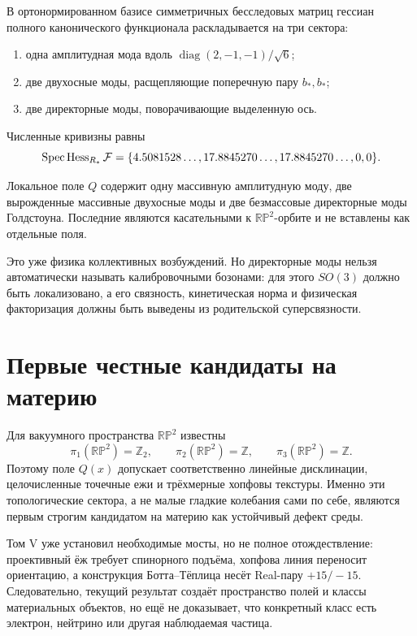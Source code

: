 В ортонормированном базисе симметричных бесследовых матриц гессиан полного
канонического функционала раскладывается на три сектора:
\begin{enumerate}
 \item одна амплитудная мода вдоль
 $\operatorname{diag}(2,-1,-1)/\sqrt6$;
 \item две двухосные моды, расщепляющие поперечную пару $b_*,b_*$;
 \item две директорные моды, поворачивающие выделенную ось.
\end{enumerate}
Численные кривизны равны
\begin{equation}
 \operatorname{Spec}\operatorname{Hess}_{R_*}\mathcal F
 =\{4.5081528\ldots,
 17.8845270\ldots,17.8845270\ldots,0,0\}.
 \label{eq:v6-projective-field-hessian}
\end{equation}

\begin{theorem}
Локальное поле $Q$ содержит одну массивную амплитудную моду, две
вырожденные массивные двухосные моды и две безмассовые директорные моды
Голдстоуна. Последние являются касательными к $\mathbb{RP}^2$-орбите и не
вставлены как отдельные поля.
\end{theorem}

Это уже физика коллективных возбуждений. Но директорные моды нельзя
автоматически называть калибровочными бозонами: для этого $SO(3)$ должно
быть локализовано, а его связность, кинетическая норма и физическая факторизация
должны быть выведены из родительской суперсвязности.

\section{Первые честные кандидаты на материю}

Для вакуумного пространства $\mathbb{RP}^2$ известны
\begin{equation}
 \pi_1(\mathbb{RP}^2)=\mathbb Z_2,
 \qquad
 \pi_2(\mathbb{RP}^2)=\mathbb Z,
 \qquad
 \pi_3(\mathbb{RP}^2)=\mathbb Z.
 \label{eq:v6-projective-homotopy-sectors}
\end{equation}
Поэтому поле $Q(x)$ допускает соответственно линейные дисклинации,
целочисленные точечные ежи и трёхмерные хопфовы текстуры. Именно эти
топологические сектора, а не малые гладкие колебания сами по себе, являются
первым строгим кандидатом на материю как устойчивый дефект среды.

Том V уже установил необходимые мосты, но не полное отождествление:
проективный ёж требует спинорного подъёма, хопфова линия переносит
ориентацию, а конструкция Ботта--Тёплица несёт Real-пару $+15/-15$.
Следовательно, текущий результат создаёт пространство полей и классы
материальных объектов, но ещё не доказывает, что конкретный класс есть
электрон, нейтрино или другая наблюдаемая частица.

